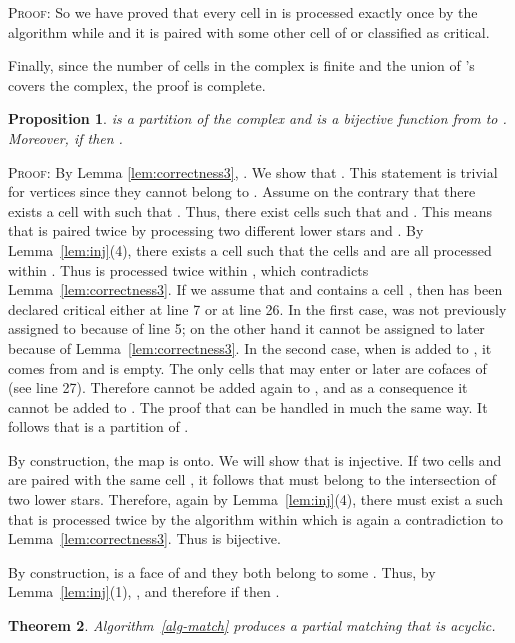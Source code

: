 \documentclass[12pt]{article}
\newtheorem{thm}{Theorem}[section]
\newtheorem{prop}[thm]{Proposition}
\newenvironment{proof}{\noindent\textsc{Proof: }}{\hfill\par\medskip\par}
\begin{document}
\begin{proof}
So we have proved that every cell in  is processed exactly once by the algorithm while  and it is paired with some other cell of  or classified as critical.

Finally, since the number of cells in the complex  is finite and the union of 's covers the complex, the proof is complete.
\end{proof}

\begin{prop}\label{lem:partition}
  is a partition of the complex  and  is a bijective function from  to .
Moreover, if  then .
\end{prop}

\begin{proof}
By Lemma \ref{lem:correctness3},  . We show that .
This statement is trivial for vertices since they cannot belong to . Assume on the contrary that there exists a cell  with  such that
. Thus, there exist cells  such that
 and . This means that  is paired twice by processing two different lower stars  and .
By Lemma~\ref{lem:inj}(4), there exists a cell  such that the cells  and  are all processed within . Thus  is
processed twice within , which contradicts Lemma~\ref{lem:correctness3}.  If we assume that 
and contains a cell , then  has been declared critical either at line 7 or at line 26. In the first case,   was not previously assigned to 
because of line 5; on the other hand it cannot be assigned to  later because of Lemma~\ref{lem:correctness3}. In the second case,  when  is added to ,
it comes from  and  is empty. The only cells that may enter  or  later are cofaces of  (see line 27).
Therefore  cannot be added again to , and as a consequence it cannot be added to . The proof that    can be handled in
much the same way. It follows that  is a partition of .

By construction, the map  is onto. We will show that  is injective. If two cells  and  are paired with the same cell , it follows that 
must belong to the intersection of two lower stars. Therefore, again by Lemma~\ref{lem:inj}(4), there must exist a  such that  is processed twice by the algorithm within
 which is again a
contradiction to Lemma~\ref{lem:correctness3}. Thus  is bijective.

By construction,  is a face of  and they both belong to some . Thus, by Lemma~\ref{lem:inj}(1),
, and therefore if  then .

\end{proof}


\begin{thm}\label{th:acyclicity}
Algorithm~\ref{alg-match} produces a partial matching  that is acyclic.
\end{thm}
\end{document}
